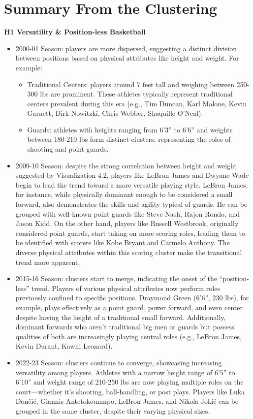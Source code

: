 \documentclass[
]{book}
\providecommand{\tightlist}{%
  \setlength{\itemsep}{0pt}\setlength{\parskip}{0pt}}
\begin{document}
\hypertarget{summary-from-the-clustering}{%
\section{Summary From the Clustering}\label{summary-from-the-clustering}}

\textbf{H1 Versatility \& Position-less Basketball}

\begin{itemize}
\tightlist
\item
  2000-01 Season: players are more dispersed, suggesting a distinct division between positions based on physical attributes like height and weight. For example:

  \begin{itemize}
  \tightlist
  \item
    Traditional Centers: players around 7 feet tall and weighing between 250-300 lbs are prominent. These athletes typically represent traditional centers prevalent during this era (e.g., Tim Duncan, Karl Malone, Kevin Garnett, Dirk Nowitzki, Chris Webber, Shaquille O'Neal).
  \item
    Guards: athletes with heights ranging from 6'3'' to 6'6'' and weights between 180-210 lbs form distinct clusters, representing the roles of shooting and point guards.
  \end{itemize}
\item
  2009-10 Season: despite the strong correlation between height and weight suggested by Visualization 4.2, players like LeBron James and Dwyane Wade begin to lead the trend toward a more versatile playing style. LeBron James, for instance, while physically dominant enough to be considered a small forward, also demonstrates the skills and agility typical of guards. He can be grouped with well-known point guards like Steve Nash, Rajon Rondo, and Jason Kidd. On the other hand, players like Russell Westbrook, originally considered point guards, start taking on more scoring roles, leading them to be identified with scorers like Kobe Bryant and Carmelo Anthony. The diverse physical attributes within this scoring cluster make the transitional trend more apparent.
\item
  2015-16 Season: clusters start to merge, indicating the onset of the ``position-less'' trend. Players of various physical attributes now perform roles previously confined to specific positions. Draymond Green (6'6'', 230 lbs), for example, plays effectively as a point guard, power forward, and even center despite having the height of a traditional small forward. Additionally, dominant forwards who aren't traditional big men or guards but possess qualities of both are increasingly playing central roles (e.g., LeBron James, Kevin Durant, Kawhi Leonard).
\item
  2022-23 Season: clusters continue to converge, showcasing increasing versatility among players. Athletes with a narrow height range of 6'5'' to 6'10'' and weight range of 210-250 lbs are now playing multiple roles on the court---whether it's shooting, ball-handling, or post plays. Players like Luka Dončić, Giannis Antetokounmpo, LeBron James, and Nikola Jokić can be grouped in the same cluster, despite their varying physical sizes.
\end{itemize}
\end{document}
